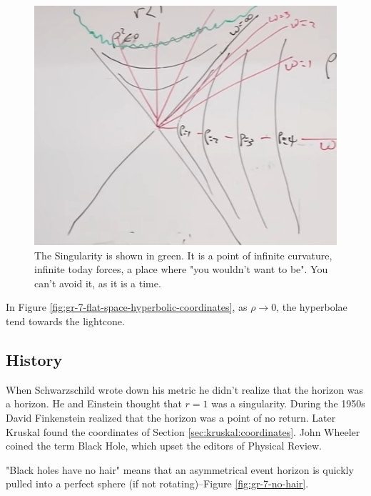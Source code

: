 \documentclass[]{article}
\begin{document}
{\begin{figure}[H]
	\caption[The Singularity: you can't avoid it, as it is a time]{The Singularity is shown in green. It is a point of infinite curvature, infinite today forces, a place where "you wouldn't want to be". You can't avoid it, as it is a time.}\label{fig:gr-7-singularity}
	\includegraphics[width=\textwidth]{gr-7-singularity}
\end{figure}

In Figure \ref{fig:gr-7-flat-space-hyperbolic-coordinates}, as $\rho \rightarrow 0$, the hyperbolae tend towards the lightcone.

\subsection{History}

When Schwarzschild wrote down his metric he didn't realize that the horizon was a horizon.
He and Einstein thought that $r=1$ was a singularity.
 During the 1950s David Finkenstein realized that the horizon was a point of no return. Later Kruskal found the coordinates of Section \ref{sec:kruskal:coordinates}. John Wheeler coined the term Black Hole, which upset the editors of Physical Review.
 
 "Black holes have no hair" means that an asymmetrical event horizon is quickly pulled into a perfect sphere (if not rotating)--Figure \ref{fig:gr-7-no-hair}.
 
}
\end{document}
